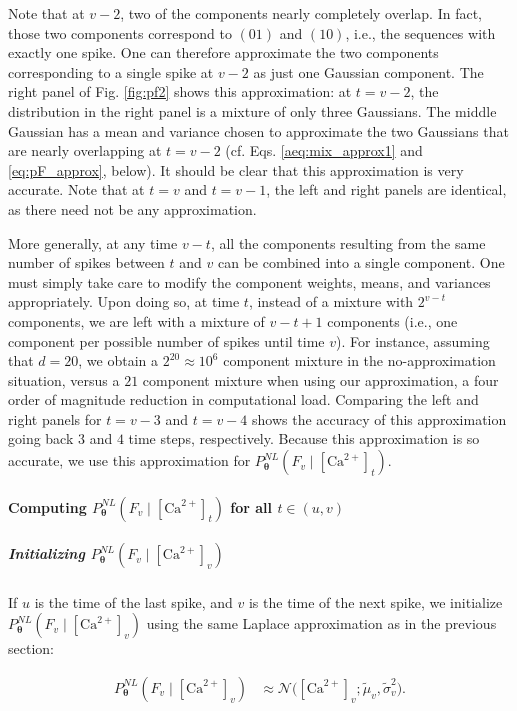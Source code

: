\documentclass[10pt]{article}
\providecommand{\ve}[1]{\boldsymbol{#1}}
\providecommand{\ve}[1]{\boldsymbol{#1}}
\newcommand{\thetn}{\ve{\theta}}
\newcommand{\p}{P_{\thetn}}
\newcommand{\Ca}{[\text{Ca}^{2+}]}
\begin{document}
Note that at $v-2$, two of the components nearly completely overlap.  In fact, those two components correspond to $(01)$ and $(10)$, i.e., the sequences with exactly one spike.   One can therefore approximate the two components corresponding to a single spike at $v-2$ as just one Gaussian component. The right panel of Fig. \ref{fig:pf2} shows this approximation: at $t=v-2$, the distribution in the right panel is a mixture of only three Gaussians.  The middle Gaussian has a mean and variance chosen to approximate the two Gaussians that are nearly overlapping at $t=v-2$ (cf. Eqs. \ref{aeq:mix_approx1} and \ref{eq:pF_approx}, below).  It should be clear that this approximation is very accurate.  Note that at $t=v$ and $t=v-1$, the left and right panels are identical, as there need not be any approximation.

More generally, at any time $v-t$, all the components resulting from the same number of spikes between $t$ and $v$ can be combined into a single component.  One must simply take care to modify the component weights, means, and variances appropriately.  Upon doing so, at time $t$, instead of a mixture with $2^{v-t}$ components, we are left with a mixture of $v-t+1$ components (i.e., one component per possible number of spikes until time $v$). For instance, assuming that $d=20$, we obtain a $2^{20} \approx 10^6$ component mixture in the no-approximation situation, versus a $21$ component mixture when using our approximation, a four order of magnitude reduction in computational load. Comparing the left and right panels for $t=v-3$ and $t=v-4$ shows the accuracy of this approximation going back $3$ and $4$ time steps, respectively. Because this approximation is so accurate, we use this approximation for $\p^{NL}(F_v \mid \Ca_t)$.

\paragraph{Computing $\p^{NL}(F_v \mid \Ca_t)$ for all $t \in (u,v)$}

\subparagraph{Initializing $\p^{NL}(F_v \mid \Ca_v)$}

If $u$ is the time of the last spike, and $v$ is the time of the next spike, we initialize $\p^{NL}(F_v \mid \Ca_v)$ using the same Laplace approximation as in the previous section:

\begin{align} \label{eq:obs_lik}
\p^{NL}(F_v \mid \Ca_v) &\approx \mathcal{N}\big(\Ca_v; \widetilde{\mu}_v, \widetilde{\sigma}_v^2\big).
\end{align}
\end{document}
